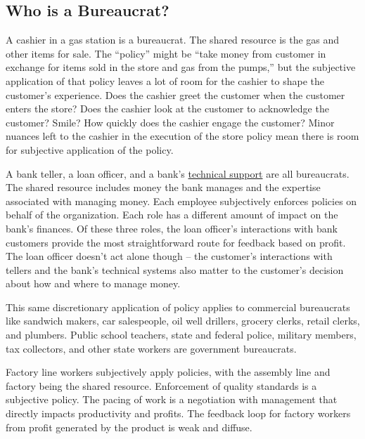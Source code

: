\subsection*{Who is a Bureaucrat?}

A cashier in a gas station is a bureaucrat. 
The shared resource is the gas and other items for sale. The ``policy'' might be ``take money from customer in exchange for items sold in the store and gas from the pumps,'' but the subjective application of that policy leaves a lot of room for the cashier to shape the customer's experience. Does the cashier greet the customer when the customer enters the store? Does the cashier look at the customer to acknowledge the customer? Smile? How quickly does the cashier engage the customer? Minor nuances left to the cashier in the execution of the store policy mean there is room for subjective application of the policy. 

A bank teller, a loan officer, and a bank's \href{https://en.wikipedia.org/wiki/Technical_support}{technical support} 
are all bureaucrats. 
The shared resource includes money the bank manages and the expertise associated with managing money. Each employee subjectively enforces policies on behalf of the organization. Each role has a different amount of impact on the bank's finances. Of these three roles, the loan officer's interactions with bank customers provide the most straightforward route for feedback based on profit. The loan officer doesn't act alone though -- the customer's interactions with tellers and the bank's technical systems also matter to the customer's decision about how and where to manage money. 


This same discretionary application of policy applies to commercial bureaucrats like sandwich makers, car salespeople, oil well drillers, grocery clerks, retail clerks, 
and plumbers. Public school teachers, state and federal police, 
military members, 
tax collectors, and other state workers are government bureaucrats. 


Factory line workers subjectively apply policies, with the assembly line and factory being the shared resource. Enforcement of quality standards is a subjective policy. The pacing of work is a negotiation with management that directly impacts productivity and profits. The feedback loop for factory workers from profit generated by the product is weak and diffuse. %

